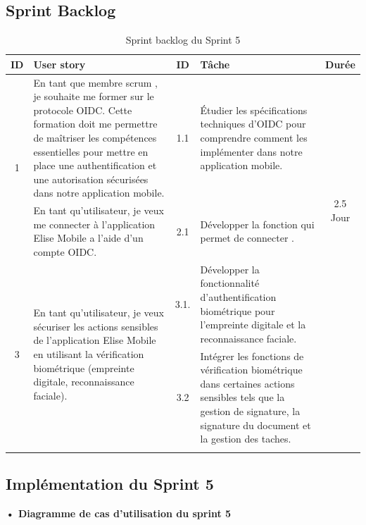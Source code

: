 \subsection{Sprint Backlog}


\begin{adjustwidth}{-1cm}{}
    
    \begin{longtable}{|c|p{6cm}|c|p{6cm}|c|}
      \hline
      \textbf{ID} & \textbf{User story} & \textbf{ID}  & \textbf{Tâche} & \textbf{Durée} \\
      \hline
      \multirow{2}{*}{1} & En tant que membre scrum , je souhaite me former sur le protocole OIDC. Cette formation doit me permettre de maîtriser les compétences essentielles pour mettre en place une authentification et une autorisation sécurisées dans notre application mobile.
      & 1.1 & Étudier les spécifications techniques d'OIDC pour comprendre comment les implémenter dans notre application mobile. & \multirow{3}{*}{2.5 Jour} \\
      \cline{1-5}
      \multirow{2}{*}{2} & En tant qu'utilisateur, je veux me connecter à l'application Elise Mobile a l'aide d'un compte OIDC. & 2.1 & Développer la fonction qui permet de connecter . &  \multirow{3}{*}{2.5 Jour} \\
      \cline{1-5}
      \multirow{2}{*}{3} & \multirow{2}{6cm}{En tant qu'utilisateur, je veux sécuriser les actions sensibles de l'application Elise Mobile en utilisant la vérification biométrique (empreinte digitale, reconnaissance faciale).} & 3.1.& Développer la fonctionnalité d'authentification biométrique pour l'empreinte digitale et la reconnaissance faciale. & \multirow{2}{*}{0.5 Jour} \\
      \cline{3-4}
      & & 3.2 & Intégrer les fonctions de vérification biométrique dans certaines actions sensibles tels que la gestion de signature, la signature du document et la gestion des taches. & \\
      \cline{1-5}
  \hline
  \caption{Sprint backlog du Sprint 5}
  \label{tab:sprint-backlog-5}
\end{longtable}
\end{adjustwidth}


\subsection{Implémentation du Sprint 5}
\textbf{•	Diagramme de cas d'utilisation du sprint 5}

